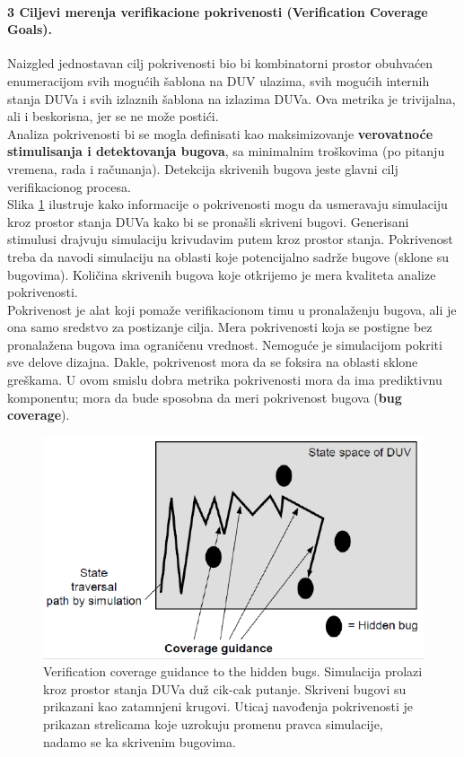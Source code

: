 \documentclass[a4paper, 12pt]{article}
\begin{document}
\paragraph{3 Ciljevi merenja verifikacione pokrivenosti (Verification Coverage Goals).}
\hfill \break
\indent Naizgled jednostavan cilj pokrivenosti bio bi kombinatorni prostor obuhvaćen enumeracijom svih mogućih šablona na DUV ulazima, svih mogućih internih stanja DUVa i svih izlaznih šablona na izlazima DUVa. Ova metrika je trivijalna, ali i beskorisna, jer se ne može postići.\\
\indent Analiza pokrivenosti bi se mogla definisati kao maksimizovanje \textbf{verovatnoće stimulisanja i detektovanja bugova}, sa minimalnim troškovima (po pitanju vremena, rada i računanja). Detekcija skrivenih bugova jeste glavni cilj verifikacionog procesa.\\
\indent Slika \ref{img-p10-2} ilustruje kako informacije o pokrivenosti mogu da usmeravaju simulaciju kroz prostor stanja DUVa kako bi se pronašli skriveni bugovi. Generisani stimulusi drajvuju simulaciju krivudavim putem kroz prostor stanja. Pokrivenost treba da navodi simulaciju na oblasti koje potencijalno sadrže bugove (sklone su bugovima). Količina skrivenih bugova koje otkrijemo je mera kvaliteta analize pokrivenosti.\\
\indent Pokrivenost je alat koji pomaže verifikacionom timu u pronalaženju bugova, ali je ona samo sredstvo za postizanje cilja. Mera pokrivenosti koja se postigne bez pronalažena bugova ima ograničenu vrednost. Nemoguće je simulacijom pokriti sve delove dizajna. Dakle, pokrivenost mora da se foksira na oblasti sklone greškama. U ovom smislu dobra metrika pokrivenosti mora da ima prediktivnu komponentu; mora da bude sposobna da meri pokrivenost bugova (\textbf{bug coverage}).\\
\begin{figure}[h!]
\centering
\includegraphics[scale=0.6]{img-p10-2.png}
\caption{Verification coverage guidance to the hidden bugs. Simulacija prolazi kroz prostor stanja DUVa duž cik-cak putanje. Skriveni bugovi su prikazani kao zatamnjeni krugovi. Uticaj navođenja pokrivenosti je prikazan strelicama koje uzrokuju promenu pravca simulacije, nadamo se ka skrivenim bugovima.}
\label{img-p10-2}
\end{figure}
\end{document}
